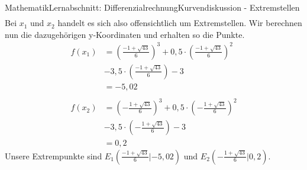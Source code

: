 \documentclass[11pt,twocolumn,oneside,openany,headings=optiontotoc,11pt,numbers=noenddot]{article}
\begin{document}
\begin{worksheet}{Mathematik}{Lernabschnitt: Differenzialrechnung}{Kurvendiskussion - Extremstellen}
\begin{align*}
		\end{align*}
		Bei \(x_1\) und \(x_2\) handelt es sich also offensichtlich um Extremstellen. Wir berechnen nun die dazugehörigen y-Koordinaten und erhalten so die Punkte.\\
		\begin{align*}
			f(x_1) & = (\frac{-1+\sqrt{43}}{6})^3 + 0,5\cdot\left(\frac{-1+\sqrt{43}}{6}\right)^2\\
			& -3,5\cdot\left(\frac{-1+\sqrt{43}}{6}\right) -3\\
			& = -5,02\\
			\\
			f(x_2) & = (-\frac{1+\sqrt{43}}{6})^3 + 0,5\cdot\left(-\frac{1+\sqrt{43}}{6}\right)^2\\
			& -3,5\cdot\left(-\frac{1+\sqrt{43}}{6}\right) -3\\
			& = 0,2
		\end{align*}
		Unsere Extrempunkte sind \(E_1(\frac{-1+\sqrt{43}}{6}|-5,02)\) und \(E_2(-\frac{1+\sqrt{43}}{6}|0,2)\).\\
	\end{worksheet}
\end{document}
